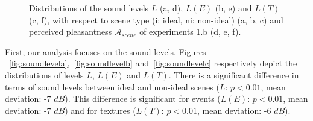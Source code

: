 \documentclass[12pt]{elsarticle}
\begin{document}
\begin{figure}[t]
       \caption{Distributions of the sound levels $L$ (a, d), $L(E)$ (b, e) and $L(T)$ (c, f), with respect to scene type (i: ideal, ni: non-ideal) (a, b, c) and perceived pleasantness $\mathcal{A}_{scene}$ of experiments 1.b (d, e, f).}
\end{figure}


First, our analysis focuses on the sound levels. Figures ~\ref{fig:soundlevela},~\ref{fig:soundlevelb} and~\ref{fig:soundlevelc} respectively depict the distributions of levels $L$, $L(E)$ and $L(T)$. There is a significant difference in terms of sound levels between ideal and non-ideal scenes ($L$: $p<0.01$, mean deviation: -7 $dB$). This difference is significant for events ($L(E)$: $p<0.01$, mean deviation: -7 $dB$) and for textures ($L(T)$: $p<0.01$, mean deviation: -6 $dB$).

\end{document}
